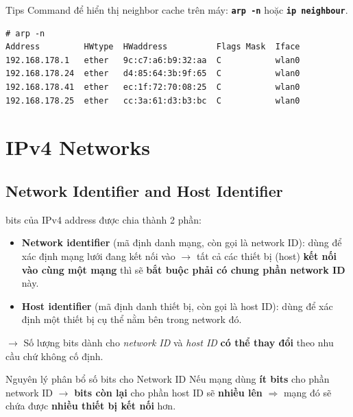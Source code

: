 \begin{mybox}{Tips}
\noindent
Command để hiển thị neighbor cache trên máy: \textbf{\texttt{arp -n}} hoặc \textbf{\texttt{ip neighbour}}.
\end{mybox}
\medskip

\begin{verbatim}
# arp -n
Address         HWtype  HWaddress          Flags Mask  Iface
192.168.178.1   ether   9c:c7:a6:b9:32:aa  C           wlan0
192.168.178.24  ether   d4:85:64:3b:9f:65  C           wlan0
192.168.178.41  ether   ec:1f:72:70:08:25  C           wlan0
192.168.178.25  ether   cc:3a:61:d3:b3:bc  C           wlan0
\end{verbatim}
\medskip

\section{IPv4 Networks}

\subsection{Network Identifier and Host Identifier}

 bits của IPv4 address được chia thành 2 phần:

\begin{itemize}
    \item \textbf{Network identifier} (mã định danh mạng, còn gọi là network ID): dùng để xác định mạng lưới đang kết nối vào $\rightarrow$ tất cả các thiết bị (host) \textbf{kết nối vào cùng một mạng} thì sẽ \textbf{bắt buộc phải có chung phần network ID} này.
    \item \textbf{Host identifier} (mã định danh thiết bị, còn gọi là host ID): dùng để xác định một thiết bị cụ thể nằm bên trong network đó.
\end{itemize}
\medskip

\noindent
$\rightarrow$ Số lượng bits dành cho \textit{network ID} và \textit{host ID} \textbf{có thể thay đổi} theo nhu cầu chứ không cố định.
\medskip

\begin{mybox}{Nguyên lý phân bổ số bits cho Network ID}
\noindent
Nếu mạng dùng \textbf{ít bits} cho phần network ID $\rightarrow$ \textbf{bits còn lại} cho phần host ID sẽ \textbf{nhiều lên} $\Rightarrow$ mạng đó sẽ chứa được \textbf{nhiều thiết bị kết nối} hơn.
\end{mybox}
\medskip


